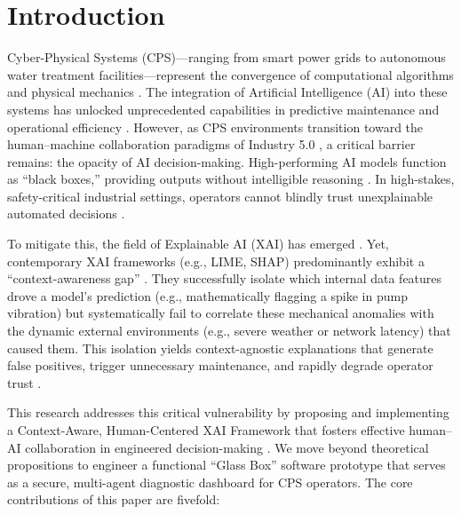 \documentclass[a4paper,fleqn]{cas-dc}
\begin{document}
\section{Introduction}

Cyber-Physical Systems (CPS)---ranging from smart power grids to autonomous water treatment facilities---represent the convergence of computational algorithms and physical mechanics \cite{ref3, ref11}. The integration of Artificial Intelligence (AI) into these systems has unlocked unprecedented capabilities in predictive maintenance and operational efficiency \cite{ref5}. However, as CPS environments transition toward the human--machine collaboration paradigms of Industry 5.0 \cite{ref38}, a critical barrier remains: the opacity of AI decision-making. High-performing AI models function as ``black boxes,'' providing outputs without intelligible reasoning \cite{ref12}. In high-stakes, safety-critical industrial settings, operators cannot blindly trust unexplainable automated decisions \cite{ref13}.

To mitigate this, the field of Explainable AI (XAI) has emerged \cite{ref16, ref26}. Yet, contemporary XAI frameworks (e.g., LIME, SHAP) predominantly exhibit a ``context-awareness gap'' \cite{ref6, ref7}. They successfully isolate which internal data features drove a model's prediction (e.g., mathematically flagging a spike in pump vibration) but systematically fail to correlate these mechanical anomalies with the dynamic external environments (e.g., severe weather or network latency) that caused them. This isolation yields context-agnostic explanations that generate false positives, trigger unnecessary maintenance, and rapidly degrade operator trust \cite{ref8, ref14}.

This research addresses this critical vulnerability by proposing and implementing a Context-Aware, Human-Centered XAI Framework that fosters effective human--AI collaboration in engineered decision-making \cite{ref_humanai}. We move beyond theoretical propositions to engineer a functional ``Glass Box'' software prototype that serves as a secure, multi-agent diagnostic dashboard for CPS operators. The core contributions of this paper are fivefold:
\end{document}
